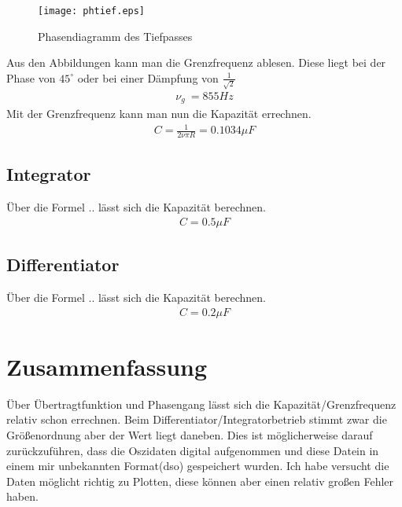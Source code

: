 \documentclass[a4paper]{article}
\begin{document}
\begin{figure}[ht]
  \begin{center}
    \texttt{[image: phtief.eps]}
  \end{center}
  \caption{Phasendiagramm des Tiefpasses}
  \label{fig:4}
\end{figure}
Aus den Abbildungen kann man die Grenzfrequenz ablesen. Diese liegt bei der Phase von $45^\circ$ oder bei einer Dämpfung von $\frac{1} {\sqrt{2}}$
\begin{align}
  \nu_g ~= 855 Hz
\end{align}
Mit der Grenzfrequenz kann man nun die Kapazität errechnen.
\begin{align}
  C =\frac{1}{2 \nu \pi R}=0.1034\mu F  
\end{align}

\subsection{Integrator}
Über die Formel .. lässt sich die Kapazität berechnen.
\begin{align}
  C = 0.5 \mu F
\end{align}

\subsection{Differentiator}
Über die Formel .. lässt sich die Kapazität berechnen.
\begin{align}
  C = 0.2 \mu F
\end{align}


\section{Zusammenfassung}
Über Übertragtfunktion und Phasengang lässt sich die Kapazität/Grenzfrequenz relativ schon errechnen. Beim Differentiator/Integratorbetrieb stimmt zwar die Größenordnung aber der Wert liegt daneben. Dies ist möglicherweise darauf zurückzuführen, dass die Oszidaten digital aufgenommen und diese Datein in einem mir unbekannten Format(dso) gespeichert wurden. Ich habe versucht die Daten möglicht richtig zu Plotten, diese können aber einen relativ großen Fehler haben.
\end{document}

